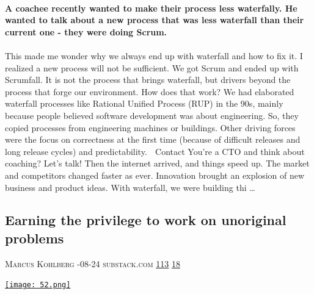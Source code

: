 \documentclass[10pt,a4paper]{article}
\begin{document}
\begin{multicols}{2}
\paragraph{}
\textbf{A coachee recently wanted to make their process less waterfally. He wanted to talk about a new process that was less waterfall than their current one - they were doing Scrum.}
\paragraph{}

This made me wonder why we always end up with waterfall and how to fix it. I realized a new process will not be sufficient. We got Scrum and ended up with Scrumfall. It is not the process that brings waterfall, but drivers beyond the process that forge our environment. How does that work?
We had elaborated waterfall processes like Rational Unified Process (RUP) in the 90s, mainly because people believed software development was about engineering. So, they copied processes from engineering machines or buildings. Other driving forces were the focus on correctness at the first time (because of difficult releases and long release cycles) and predictability.
💬 Contact
You're a CTO and think about coaching? Let's talk!
Then the internet arrived, and things speed up. The market and competitors changed faster as ever. Innovation brought an explosion of new business and product ideas. With waterfall, we were building thi
\dots\par
\noindent\begin{minipage}{\linewidth}
\medskip
\subsection{Earning the privilege to work on unoriginal problems}
\textsc{\footnotesize
{\scriptsize\faUser}\space 
Marcus Kohlberg 
{\scriptsize\faCalendar}-08-24 
{\scriptsize\faGlobe}\space 
substack.com 
{\scriptsize\faThumbsOUp}\space 
\href{http://news.ycombinator.com/item?id=37272362\&utm\_term=comment}{113} 
{\scriptsize\faComments}\space 
\href{http://news.ycombinator.com/item?id=37272362\&utm\_term=comment}{18} 
}
\par\medskip\noindent
\href{https://landmines.substack.com/p/earning-the-privilege-to-work-on?utm\_source=hackernewsletter\&utm\_medium=email\&utm\_term=working}{
    \texttt{[image: 52.png]}
}
\end{minipage}

\end{multicols}
\end{document}
